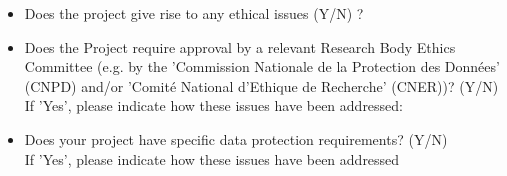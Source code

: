 % 


\begin{itemize}
  \item Does the project give rise to any ethical issues (Y/N) ?
  \item Does the Project require approval by a relevant Research Body Ethics
    Committee (e.g. by the 'Commission Nationale de la Protection des
    Donn\'ees' (CNPD) and/or 'Comit\'e National d'Ethique de Recherche' (CNER))?
    (Y/N)
    \\
    If 'Yes', please indicate how these issues have been addressed:
  \item Does your project have specific data protection requirements? (Y/N)\\
    If 'Yes', please indicate how these issues have been addressed
\end{itemize}



% 
